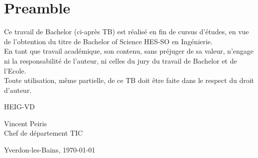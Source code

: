 \hspace{0pt}
\vfill
\section{Preamble}
Ce travail de Bachelor (ci-après TB) est réalisé en fin de cursus d’études, en vue de l'obtention du titre de Bachelor of Science HES-SO en Ingénierie. \\

En tant que travail académique, son contenu, sans préjuger de sa valeur, n'engage ni la responsabilité de l'auteur, ni celles du jury du travail de Bachelor et de l'Ecole. \\

Toute utilisation, même partielle, de ce TB doit être faite dans le respect du droit d’auteur. \\

\begin{flushright}
    \begin{minipage}{7cm}
        \vspace{2cm}
        HEIG-VD \\

        \vspace{2cm}

        Vincent Peiris\\
        Chef de département TIC
    \end{minipage}\hfill
\end{flushright}

\vspace{3cm}

Yverdon-les-Bains, \today
\vfill
\hspace{0pt}

